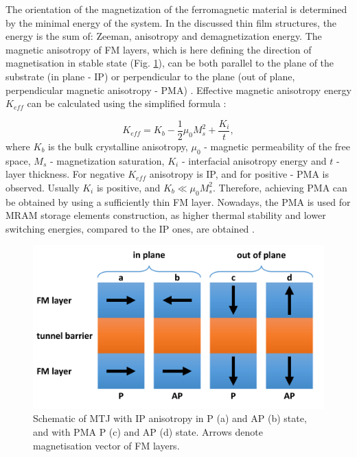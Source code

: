     The orientation of the magnetization of the ferromagnetic material is determined by the minimal energy of the system. In the discussed thin film structures, the energy is the sum of: Zeeman, anisotropy and demagnetization energy. The magnetic anisotropy of FM layers, which is here defining the direction of magnetisation in stable state (Fig. \ref{PrinciplesMTJSchematic}), can be both parallel to the plane of the substrate (in plane - IP) \cite{yuasa2007giant} or perpendicular to the plane (out of plane, perpendicular magnetic anisotropy - PMA) \cite{yakushiji2008spin}. Effective magnetic anisotropy energy $K_{eff}$ can be calculated using the simplified formula \cite{johnson1996magnetic, draaisma1988surface, ikeda2010perpendicular}:
    
    \begin{equation} \label{eq:Keff}
		K_{eff} = K_b - \frac{1}{2}\mu_0M_s^2 + \frac{K_i}{t},
	\end{equation}
where $K_b$ is the bulk crystalline anisotropy, $\mu_0$ - magnetic permeability of the free space, $M_s$ - magnetization saturation, $K_i$ - interfacial anisotropy energy and $t$ - layer thickness.  For negative $K_{eff}$ anisotropy is IP, and for positive - PMA is observed. Usually $K_i$ is positive, and $K_b \ll\mu_0M_s^2$.  Therefore, achieving PMA can be obtained by using a sufficiently thin FM layer. Nowadays, the PMA is used for MRAM storage elements construction, as higher thermal stability and lower switching energies, compared to the IP ones, are obtained \cite{mangin2006current}.
    
    \begin{figure}[H]
        \centering
        \includegraphics[width=0.75\paperwidth, page=1]{img/03/TMR_sch.pdf}
        \caption{Schematic of MTJ with IP anisotropy in P (a) and AP (b) state, and with PMA P (c) and AP (d) state. Arrows denote magnetisation vector of FM layers.}
        \label{PrinciplesMTJSchematic}
    \end{figure} 


